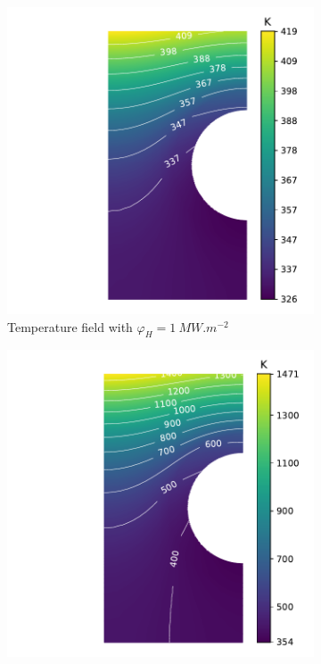 \begin{figure} [h!]
    \centering
    \begin{subfigure}{0.4\linewidth}
        \centering
        \includegraphics[width=\linewidth]{Figures/Chapter3/monoblocks/parametric_study/T_1e6.pdf}
        \caption{Temperature field with $\varphi_H = \SI{1}{MW.m^{-2}}$}
        \label{fig:T field 1 MW}
    \end{subfigure}%
    \begin{subfigure}{0.4\linewidth}
        \centering
        \includegraphics[width=\linewidth]{Figures/Chapter3/monoblocks/parametric_study/T_1e7.pdf}

\end{subfigure}
\end{figure}
